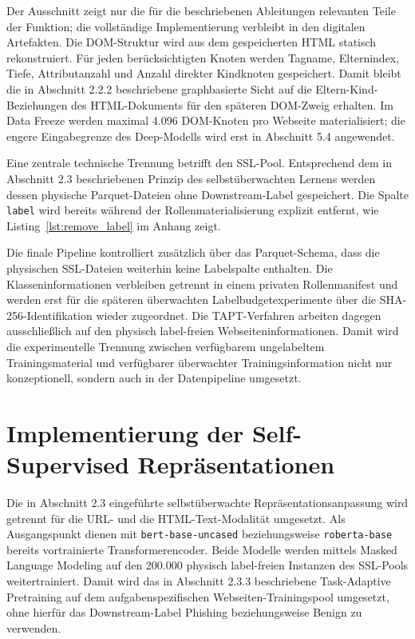 Der Ausschnitt zeigt nur die für die beschriebenen Ableitungen relevanten Teile der Funktion;
die vollständige Implementierung verbleibt in den digitalen Artefakten. Die DOM-Struktur wird
aus dem gespeicherten HTML statisch rekonstruiert. Für jeden berücksichtigten Knoten werden
Tagname, Elternindex, Tiefe, Attributanzahl und Anzahl direkter Kindknoten gespeichert. Damit
bleibt die in Abschnitt 2.2.2 beschriebene graphbasierte Sicht auf die
Eltern-Kind-Beziehungen des HTML-Dokuments für den späteren DOM-Zweig erhalten. Im Data
Freeze werden maximal 4.096 DOM-Knoten pro Webseite materialisiert; die engere
Eingabegrenze des Deep-Modells wird erst in Abschnitt 5.4 angewendet.

Eine zentrale technische Trennung betrifft den SSL-Pool. Entsprechend dem in Abschnitt 2.3
beschriebenen Prinzip des selbstüberwachten Lernens werden dessen physische Parquet-Dateien
ohne Downstream-Label gespeichert. Die Spalte \texttt{label} wird bereits während der
Rollenmaterialisierung explizit entfernt, wie Listing~\ref{lst:remove_label} im Anhang zeigt.

Die finale Pipeline kontrolliert zusätzlich über das Parquet-Schema, dass die physischen
SSL-Dateien weiterhin keine Labelspalte enthalten. Die Klasseninformationen verbleiben
getrennt in einem privaten Rollenmanifest und werden erst für die späteren überwachten
Labelbudgetexperimente über die SHA-256-Identifikation wieder zugeordnet. Die TAPT-Verfahren
arbeiten dagegen ausschließlich auf den physisch label-freien Webseiteninformationen. Damit
wird die experimentelle Trennung zwischen verfügbarem ungelabeltem Trainingsmaterial und
verfügbarer überwachter Trainingsinformation nicht nur konzeptionell, sondern auch in der
Datenpipeline umgesetzt.

\section{Implementierung der Self-Supervised Repräsentationen}

Die in Abschnitt 2.3 eingeführte selbstüberwachte Repräsentationsanpassung wird getrennt für
die URL- und die HTML-Text-Modalität umgesetzt. Als Ausgangspunkt dienen mit
\texttt{bert-base-uncased} beziehungsweise \texttt{roberta-base} bereits vortrainierte
Transformerencoder. Beide Modelle werden mittels Masked Language Modeling auf den
200.000 physisch label-freien Instanzen des SSL-Pools weitertrainiert. Damit wird das in
Abschnitt 2.3.3 beschriebene Task-Adaptive Pretraining auf dem aufgabenspezifischen
Webseiten-Trainingspool umgesetzt, ohne hierfür das Downstream-Label Phishing
beziehungsweise Benign zu verwenden.

